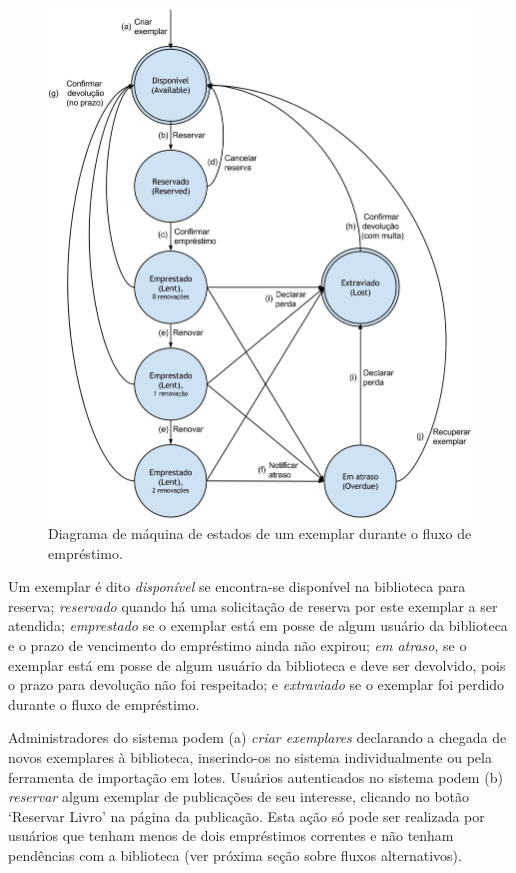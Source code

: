 \documentclass[a4paper]{article}
\begin{document}
\begin{figure}[pbth!]
\centering
\includegraphics[width=140mm]{img/workflow.png}
\caption{Diagrama de máquina de estados de um exemplar durante o fluxo de empréstimo.\label{workflow}}
\end{figure}

Um exemplar é dito \textit{disponível} se encontra-se disponível na biblioteca para reserva; \textit{reservado} quando há uma solicitação de reserva por este exemplar a ser atendida; \textit{emprestado} se o exemplar está em posse de algum usuário da biblioteca e o prazo de vencimento do empréstimo ainda não expirou; \textit{em atraso}, se o exemplar está em posse de algum usuário da biblioteca e deve ser devolvido, pois o prazo para devolução não foi respeitado; e \textit{extraviado} se o exemplar foi perdido durante o fluxo de empréstimo.

Administradores do sistema podem (a) \textit{criar exemplares} declarando a chegada de novos exemplares à biblioteca, inserindo-os no sistema individualmente ou pela ferramenta de importação em lotes. Usuários autenticados no sistema podem (b) \textit{reservar} algum exemplar de publicações de seu interesse, clicando no botão ‘Reservar Livro’ na página da publicação. Esta ação só pode ser realizada por usuários que tenham menos de dois empréstimos correntes e não tenham pendências com a biblioteca (ver próxima seção sobre fluxos alternativos).
\end{document}
